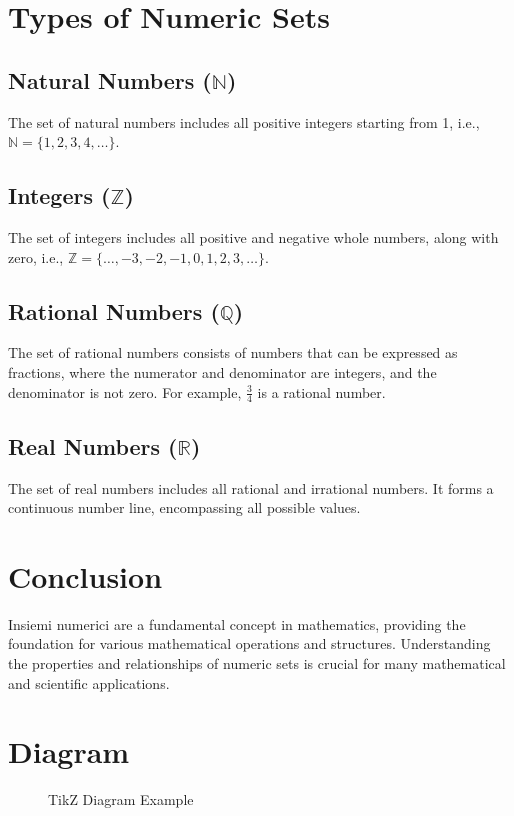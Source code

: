 \documentclass{article}
\begin{document}
\section{Types of Numeric Sets}
\subsection{Natural Numbers (\(\mathbb{N}\))}
The set of natural numbers includes all positive integers starting from 1, i.e., \(\mathbb{N} = \{1, 2, 3, 4, \ldots\}\).

\subsection{Integers (\(\mathbb{Z}\))}
The set of integers includes all positive and negative whole numbers, along with zero, i.e., \(\mathbb{Z} = \{\ldots, -3, -2, -1, 0, 1, 2, 3, \ldots\}\).

\subsection{Rational Numbers (\(\mathbb{Q}\))}
The set of rational numbers consists of numbers that can be expressed as fractions, where the numerator and denominator are integers, and the denominator is not zero. For example, \(\frac{3}{4}\) is a rational number.

\subsection{Real Numbers (\(\mathbb{R}\))}
The set of real numbers includes all rational and irrational numbers. It forms a continuous number line, encompassing all possible values.

\section{Conclusion}
Insiemi numerici are a fundamental concept in mathematics, providing the foundation for various mathematical operations and structures. Understanding the properties and relationships of numeric sets is crucial for many mathematical and scientific applications.

\newpage

\section{Diagram}
\begin{figure}[h]
  \centering
  \caption{TikZ Diagram Example}
\end{figure}
\end{document}
